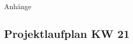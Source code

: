 %
%
%
%

\begin{appendix}

\newpage

\begin{center}
	\huge{Anhänge}
\end{center}

\normalsize

%
%
%	
%		

\newpage
\begin{landscape}
	\section{Projektlaufplan KW 21}
	\label{sec:projectplan}
	\scalebox{.75}{
		
		}
\end{landscape}


\end{appendix}

